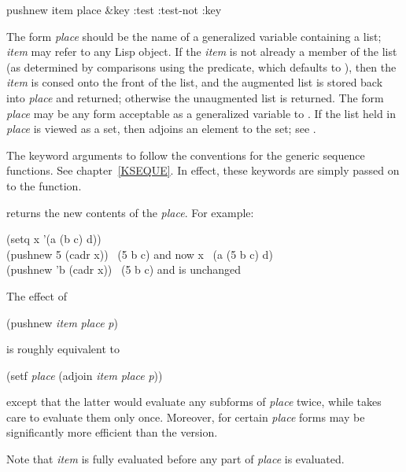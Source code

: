 \begin{defmac}
pushnew item place &key :test :test-not :key

The form \emph{place} should be the name of a generalized variable
containing a list; \emph{item} may refer to any Lisp object.  If the
\emph{item} is not already a member of the list (as determined by
comparisons using the  predicate, which defaults to ),
then the \emph{item} is consed onto the front of the list, and
the augmented list is stored back into \emph{place} and returned; otherwise
the unaugmented list is returned.  The form \emph{place} may be
any form acceptable as a generalized variable to .  If the
list held in \emph{place} is viewed as a set, then  adjoins an
element to the set; see .

The keyword arguments to 
follow the conventions for the generic sequence
functions.  See chapter~\ref{KSEQUE}.
In effect, these keywords are simply passed on to the  function.

 returns the new contents of the \emph{place}.
For example:
\begin{lisp}
(setq x '(a (b c) d)) \\
(pushnew 5 (cadr x)) \EV\ (5 b c)   \textrm{and now} x \EV\ (a (5 b c) d) \\
(pushnew 'b (cadr x)) \EV\ (5 b c)  \textrm{and  is unchanged}
\end{lisp}
The effect of
\begin{lisp}
(pushnew \emph{item} \emph{place}  \emph{p})
\end{lisp}
is roughly equivalent to
\begin{lisp}
(setf \emph{place} (adjoin \emph{item} \emph{place}  \emph{p}))
\end{lisp}
except that the latter would evaluate any subforms of
\emph{place} twice, while  takes care to evaluate them only once.
Moreover, for certain \emph{place} forms  may be
significantly more efficient than the  version.

Note that \emph{item} is fully evaluated before any part of \emph{place}
is evaluated.
\end{defmac}

